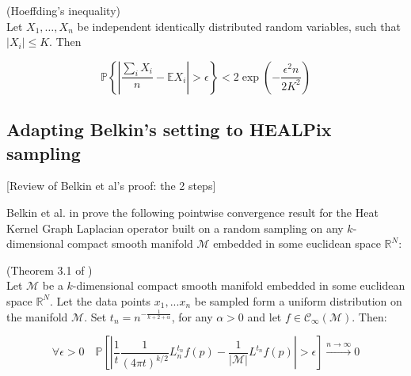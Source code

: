 \begin{prop}(Hoeffding's inequality)\\
	Let \(X_{1}, \ldots, X_{n}\) be independent identically distributed random variables, such that
	\(\left|X_{i}\right| \leqslant K .\) Then
	
	$$
	\mathbb P\left\{\left|\frac{\sum_{i} X_{i}}{n}-\mathbb{E} X_{i}\right|>\epsilon\right\}<2 \exp \left(-\frac{\epsilon^{2} n}{2 K^{2}}\right)
	$$
	\label{theo:Hoeffding}
\end{prop}
\subsection{Adapting Belkin's setting to HEALPix sampling}

[Review of Belkin et al's proof: the 2 steps] 

Belkin et al. in \cite{Belkin:2005:TTF:2138147.2138189} prove the following pointwise convergence result for the Heat Kernel Graph Laplacian operator built on a random sampling on any $k$-dimensional compact smooth manifold $\mathcal M$ embedded in some euclidean space $\mathbb R^N$:
\vspace{0.5cm}
\begin{theorem}{(Theorem 3.1 of \cite{Belkin:2005:TTF:2138147.2138189})}\\
	\label{theo:Belkin pointwise convergence}
	Let $\mathcal M$ be a $k$-dimensional compact smooth manifold embedded in some euclidean space $\mathbb R^N$. Let the data points $x_1, ... x_n$ be sampled form a uniform distribution on the manifold $\mathcal M$. Set $t_n=n^{-\frac{1}{k+2+\alpha}}$, for any $\alpha>0$ and let $f\in\mathcal C_\infty(\mathcal M)$. Then:
	
	$$\forall \epsilon>0\quad \mathbb{P}\left[\left|\frac{1}{t}\frac{1}{(4 \pi t)^{k/2}}L_{n}^{t_n} f(p)-  \frac{1}{|\mathcal M|}L^{t_n} f(p)\right|>\epsilon\right] \xrightarrow{n\to\infty} 0$$
\end{theorem}
\vspace{0.5cm}

